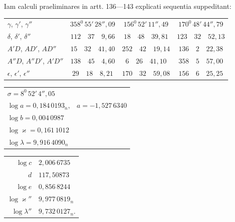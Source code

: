 Iam calculi praeliminares in artt. 136---143 explicati sequentia suppeditant:
\begin{center}\begingroup\footnotesize\setlength{\tabcolsep}{3pt}\renewcommand{\arraystretch}{1.3}
\begin{tabular}{l|c|c|c}
$\gamma$, $\gamma'$, $\gamma''$ & $358^0\,55'\,28''{,}09$ & $156^0\,52'\,11''{,}49$ & $170^0\,48'\,44''{,}79$ \\
$\delta$, $\delta'$, $\delta''$ & $112\quad37\quad9{,}66$ & $18\quad48\quad39{,}81$ & $123\quad32\quad52{,}13$ \\
$A'D$, $AD'$, $AD''$ & $15\quad32\quad41{,}40$ & $252\quad42\quad19{,}14$ & $136\quad2\quad22{,}38$ \\
$A''D$, $A''D'$, $A'D''$ & $138\quad45\quad4{,}60$ & $6\quad26\quad41{,}10$ & $358\quad5\quad57{,}00$ \\
$\epsilon$, $\epsilon'$, $\epsilon''$ & $29\quad18\quad8{,}21$ & $170\quad32\quad59{,}08$ & $156\quad6\quad25{,}25$ \\
\end{tabular}
\endgroup\end{center}
\begin{center}\begingroup\footnotesize\setlength{\tabcolsep}{3pt}\renewcommand{\arraystretch}{1.3}
\begin{tabular}{ll}
$\sigma=8^0\,52'\,4''{,}05$ & \\
$\log a=0{,}184\,0193_n$, & $a=-1{,}527\,6340$\\
$\log b=0{,}004\,0987$ & \\
$\log\varkappa=0{,}161\,1012$ & \\
$\log\lambda=9{,}916\,4090_n$ &
\end{tabular}
\par\smallskip
\begin{tabular}{r@{\;=\;}l}
$\log c$ & $2{,}006\,6735$\\
$d$ & $117{,}50873$\\
$\log e$ & $0{,}856\,8244$\\
$\log\varkappa''$ & $9{,}977\,0819_n$\\
$\log\lambda''$ & $9{,}732\,0127_n$.
\end{tabular}
\endgroup\end{center}

